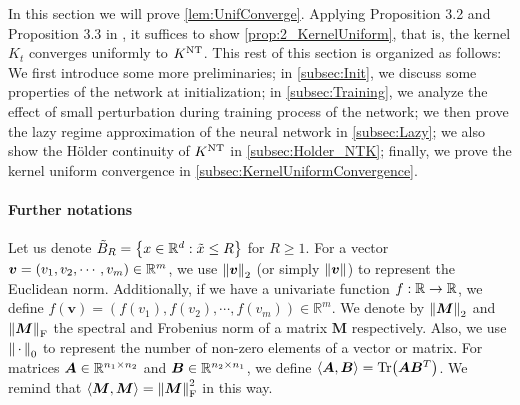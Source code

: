 In this section we will prove \cref{lem:UnifConverge}.
Applying Proposition 3.2 and Proposition 3.3 in \citet{lai2023_GeneralizationAbility},
it suffices to show \cref{prop:2_KernelUniform}, that is, the kernel $K_t$ converges uniformly to $K^{\mathrm{NT}}$.
This rest of this section is organized as follows:
We first introduce some more preliminaries;
in \cref{subsec:Init}, we discuss some properties of the network at initialization;
in \cref{subsec:Training}, we analyze the effect of small perturbation during training process of the network;
we then prove the lazy regime approximation of the neural network in \cref{subsec:Lazy};
we also show the Hölder continuity of $K^{\mathrm{NT}}$ in \cref{subsec:Holder_NTK};
finally, we prove the kernel uniform convergence in \cref{subsec:KernelUniformConvergence}.


\paragraph{Further notations}
Let us denote $\tilde{B}_R = \left\{ x \in \mathbb{R}^d : \tilde{x} \leq R \right\}$ for $R\geq 1$.
For a vector $\bm{v}=(v_1, v_2, \cdots, v_m)\in\mathbb{R}^m$, we use $\norm{\bm{v}}_2$ (or simply $\norm{\bm{v}}$) to represent the Euclidean norm.
Additionally, if we have a univariate function $f:\mathbb{R}\to\mathbb{R}$, we define $f(\bm{v}) = (f(v_1), f(v_2),\cdots, f(v_m))\in\mathbb{R}^m$.
We denote by $\norm{\bm{M}}_2$ and $\norm{\bm{M}}_{\mathrm{F}}$ the spectral and Frobenius norm of a matrix $\bm{M}$ respectively.
Also, we use $\norm{\,\cdot\,}_0$ to represent the number of non-zero elements of a vector or matrix.
For matrices $\bm{A}\in\mathbb{R}^{n_1\times n_2}$ and $\bm{B}\in\mathbb{R}^{n_2\times n_1}$,
we define $\left\langle{\bm{A},\bm{B}}\right\rangle = \Tr(\bm{A}\bm{B}^T)$.
We remind that $\left\langle{\bm{M}, \bm{M}}\right\rangle = \norm{\bm{M}}_{\mathrm{F}}^2$ in this way.

